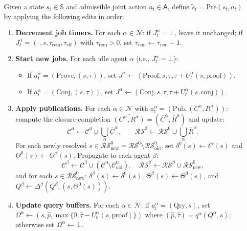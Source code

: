 Given a state $s_t\in\mathsf{S}$ and admissible joint action $a_t\in\mathsf{A}$, define
$\tilde s_t = \mathrm{Pre}(s_t,a_t)$ by applying the following edits in order:
\begin{enumerate}
    \item \textbf{Decrement job timers.} For each $\alpha \in \mathcal{N}$: if $J^\alpha_t=\bot$, leave it unchanged; if $J^\alpha_t=(\cdot,s,\tau_{\mathrm{rem}},\tau_{\mathrm{eff}})$ with $\tau_{\mathrm{rem}}>0$, set
$\tau_{\mathrm{rem}}\leftarrow \tau_{\mathrm{rem}}-1$.
 
\item \textbf{Start new jobs.} For each idle agent $\alpha$ (i.e., $J^\alpha_t=\bot$):
\begin{itemize}
    \item If $a^\alpha_t=(\mathrm{Prove},(s,\tau))$, set
$J^\alpha \leftarrow (\mathrm{Proof},s,\tau,\tau+U^\alpha_t(s,\mathrm{proof}))$.
	\item If $a^\alpha_t=(\mathrm{Conj},(s,\tau))$, set
$J^\alpha \leftarrow (\mathrm{Conj},s,\tau,\tau+U^\alpha_t(s,\mathrm{conj}))$.
\end{itemize}
 
\item \textbf{Apply publications.} For each $\alpha\in\mathcal{N}$ with $a^\alpha_t=(\mathrm{Pub},(C^\alpha,R^\alpha))$: compute the closure-completion $\overline{(C^\alpha,R^\alpha)}=(\overline{C}^\alpha,\overline{R}^\alpha)$ and update:
\[\mathcal C^0 \leftarrow \mathcal C^0 \cup \textstyle\bigcup_{\alpha}\overline C^\alpha,
\qquad
\mathcal{RS}^0 \leftarrow \mathcal{RS}^0 \cup \textstyle\bigcup_{\alpha}\overline R^\alpha.\]
For each newly resolved $s \in \mathcal{RS}^0_{\mathrm{new}} = \mathcal{RS}^0 \setminus \mathcal{RS}^0_{\mathrm{old}}$, set $\delta^0(s) \leftarrow \delta^\alpha(s)$ and $\Theta^0(s) \leftarrow \Theta^\alpha(s)$.
Propagate to each agent $\beta$:
\[\mathcal C^\beta \leftarrow \mathcal C^\beta \cup (\mathcal C^0\setminus \mathcal C^0_{\mathrm{old}}),\quad
\mathcal{RS}^\beta \leftarrow \mathcal{RS}^\beta \cup \mathcal{RS}^0_{\mathrm{new}},\]
and for each $s\in \mathcal{RS}^0_{\mathrm{new}}$:
$\delta^\beta(s)\leftarrow\delta^0(s)$, $\Theta^\beta(s)\leftarrow\Theta^0(s)$, and $Q^\beta \leftarrow \Delta^\beta(Q^\beta,(s,\Theta^0(s)))$.
 
\item \textbf{Update query buffers.} For each $\alpha\in\mathcal{N}$: if $a^\alpha_t=(\mathrm{Qry},s)$, set
$\Omega^\alpha \leftarrow (s,\hat p,\max\{0,\hat\tau-U^\alpha_t(s,\mathrm{proof})\})$
where $(\hat p,\hat\tau)=q^\alpha(Q^\alpha,s)$; otherwise set $\Omega^\alpha\leftarrow \bot$.
\end{enumerate}
 
